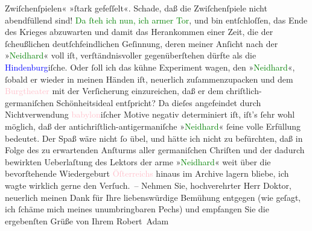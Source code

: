                Zwiſchenſpielen« »ſtark gefeſſelt«. Schade, daß die Zwiſchenſpiele nicht abendfüllend
               sind!\pend
           \pstart
           \textcolor{green}{Da ſteh ich nun, ich armer Tor}{},
               und bin entſchloſſen, das Ende des Krieges abzuwarten und damit das Herankommen einer
               Zeit, die der ſcheußlichen deutſchfeindlichen Geſinnung, deren meiner Anſicht nach
               der »\textcolor{green}{Neidhard}{}\ledrightnote{\textcolor{green}{Neidhard}}« voll iſt, verſtändnisvoller
               gegenüberſtehen dürfte als die \textcolor{blue}{Hindenburg}{}\ledrightnote{\textcolor{blue}{Paul von Hindenburg}}iſche.
               Oder ſoll ich das kühne Experiment wagen, den »\textcolor{green}{Neidhard}{}\ledrightnote{\textcolor{green}{Neidhard}}«, ſobald er wieder in meinen Händen iſt, neuerlich zuſammenzupacken
               und dem \textcolor{pink}{Burgtheater}{}\ledrightnote{\textcolor{pink}{Burgtheater}} mit der Verſicherung
               einzureichen, daß er dem chriſtlich-germaniſchen Schönheitsideal entſpricht? Da
               dieſes angefeindet {\pb}durch Nichtverwendung \textcolor{pink}{babylon}{}\ledrightnote{\textcolor{pink}{Babylon}}iſcher Motive negativ determiniert iſt, iſt’s
               ſehr wohl möglich, daß der antichriſtlich-antigermaniſche »\textcolor{green}{Neidhard}{}\ledrightnote{\textcolor{green}{Neidhard}}« ſeine volle Erfüllung bedeutet. Der Spaß wäre nicht ſo
               übel, und hätte ich nicht zu befürchten, daß in Folge des zu erwartenden Anſturms
               aller germaniſchen Chriſten und der dadurch bewirkten Ueberlaſtung des Lektors der
               arme »\textcolor{green}{Neidhard}{}\ledrightnote{\textcolor{green}{Neidhard}}« 
               weit über die bevorſtehende Wiedergeburt \textcolor{pink}{Öſterreichs}{}\ledrightnote{\textcolor{pink}{Österreich}} hinaus im Archive lagern bliebe, ich wagte wirklich gerne den
               Verſuch. –\pend
           \pstart
           Nehmen Sie, hochverehrter Herr Doktor, neuerlich meinen Dank für Ihre liebenswürdige
               Bemühung entgegen (wie geſagt, ich ſchäme mich meines unumbringbaren Pechs) und
               empfangen Sie die ergebenſten Grüße von Ihrem\pend
           \pstart \spacefill\mbox{Robert Adam}\pend{}\endnumbering{}  
      